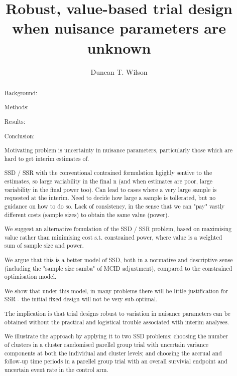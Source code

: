 \documentclass[sagev]{sagej}
\begin{document}

\title{Robust, value-based trial design when nuisance parameters are unknown}

\author{Duncan T. Wilson}%



\begin{abstract}

Background: 

Methods:

Results: 

Conclusion:

Motivating problem is uncertainty in nuisance parameters, particularly those which are hard to get interim estimates of.

SSD / SSR with the conventional contrained formulation hgighly sentive to the estimates, so large variability in the
final n (and when estimates are poor, large variability in the final power too). Can lead to cases where a very large
sample is requested at the interim. Need to decide how large a sample is tollerated, but no guidance on how to do so.
Lack of consistency, in the sense that we can "pay" vastly different costs (sample sizes) to obtain the same value (power).

We suggest an alternative fomulation of the SSD / SSR problem, based on maximising value rather than minimising cost s.t. constrained power,
where value is a weighted sum of sample size and power.

We argue that this is a better model of SSD, both in a normative and descriptive sense (including the "sample size samba" of MCID adjustment), 
compared to the constrained optimisation model.

We show that under this model, in many problems there will be little justification for SSR - the initial fixed design will not be very sub-optimal.

The implication is that trial designs robust to variation in nuisance parameters can be obtained without the practical and logistical 
trouble associated with interim analyses.

We illustrate the approach by applying it to two SSD problems: choosing the number of clusters in a cluster randomised parellel group trial 
with uncertain variance components at both the individual and cluster levels; and choosing the accrual and follow-up
time periods in a parellel group trial with an overall survivial endpoint and uncertain event rate in the control arm.

\end{abstract}
\end{document}
